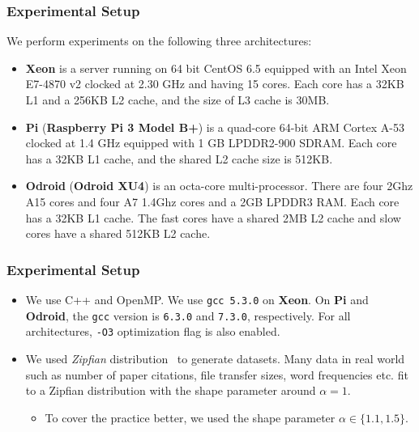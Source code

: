\documentclass{beamer}
\begin{document}
\begin{frame}
	\frametitle{Experimental Setup}
	We perform experiments on the following three architectures: 
	\begin{itemize}
		\item {\bf Xeon} is a server running on 64 bit CentOS 6.5 equipped with an Intel Xeon E7-4870 v2 clocked at 2.30 GHz and having 15 cores. Each core has a 32KB L1 and a 256KB L2 cache, and the size of L3 cache is 30MB. 
		\item {\bf Pi} ({\bf Raspberry Pi 3 Model B+}) is a quad-core 64-bit ARM Cortex A-53 clocked at 1.4 GHz equipped with 1 GB LPDDR2-900 SDRAM. Each core has a 32KB L1 cache, and the shared L2 cache size is 512KB.
		\item {\bf Odroid} ({\bf Odroid XU4}) is an octa-core multi-processor. There are four 2Ghz A15 cores and four A7 1.4Ghz cores and a 2GB LPDDR3 RAM. Each core has a 32KB L1 cache. The fast cores have a shared 2MB L2 cache and slow cores have a shared 512KB L2 cache. 
	\end{itemize}
\end{frame}

\begin{frame}
	\frametitle{Experimental Setup}
	\begin{itemize}
		\item We use C++ and OpenMP. We use {\tt gcc 5.3.0} on {\bf Xeon}. On {\bf Pi} and  {\bf Odroid}, the {\tt gcc} version is {\tt 6.3.0} and {\tt 7.3.0}, respectively. For all architectures, {\tt -O3} optimization flag is also enabled.
		\item We used {\em Zipfian} distribution~\cite{Zipf1935} to generate datasets. Many data in real world such as number of paper citations, file transfer sizes, word frequencies etc. fit to a Zipfian distribution with the shape parameter around $\alpha = 1$.
		\begin{itemize}
		\item To cover the practice better, we used the shape parameter $\alpha \in \{1.1, 1.5\}$.
		\end{itemize}
	\end{itemize}
\end{frame}
\end{document}
